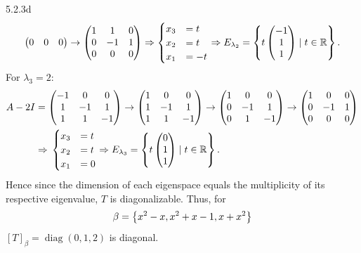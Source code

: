 \documentclass{exam}
\begin{document}
\begin{problem}{5.2.3d}
\[\begin{pmatrix}
          0 & 0 & 0
        \end{pmatrix}
        \to \begin{pmatrix}
          1 & 1 & 0 \\
          0 & -1 & 1 \\
          0 & 0 & 0 
        \end{pmatrix}
        \Rightarrow \begin{cases}
          x_3 &= t \\
          x_2 &= t \\
          x_1 &= -t 
        \end{cases}
        \Rightarrow E_{\lambda_{2}} = \left\{
          t\begin{pmatrix}
            -1 \\ 1 \\ 1
          \end{pmatrix}
          \mid t \in \mathbb R
         \right\}.
    \]
    For $\lambda_3 = 2$: 
    \begin{align*}
      A - 2I &= \begin{pmatrix}
        -1 & 0 & 0 \\
        1 & -1 & 1 \\
        1 & 1 & -1 
      \end{pmatrix}
      \to \begin{pmatrix}
        1 & 0 & 0 \\
        1 & -1 & 1 \\
        1 & 1 & -1 
      \end{pmatrix}
      \to \begin{pmatrix}
        1 & 0 & 0 \\
        0 & -1 & 1 \\
        0 & 1 & -1 
      \end{pmatrix}
      \to \begin{pmatrix}
        1 & 0 & 0 \\
        0 & -1 & 1 \\
        0 & 0 & 0
      \end{pmatrix} \\
      &\Rightarrow\, \begin{cases}
        x_3 &= t \\
        x_2 &= t \\
        x_1 &= 0 
      \end{cases}
      \Rightarrow E_{\lambda_{3}} = \left\{
        t\begin{pmatrix}
          0 \\ 1 \\ 1
        \end{pmatrix}
        \mid t \in \mathbb R
       \right\}.
    \end{align*}
    Hence since the dimension of each eigenspace equals the multiplicity of its respective eigenvalue, $T$ is diagonalizable. Thus, for 
    \[
      \beta = \left\{x^2 - x, x^2 + x - 1, x + x^2 \right\}
    \]
    $[T]_\beta = \operatorname{diag}(0, 1, 2)$ is diagonal.
  \end{problem}
\end{document}
